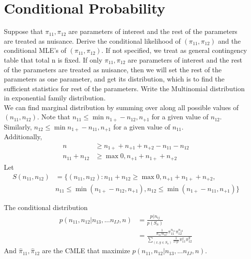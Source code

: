 \section{Conditional Probability}

Suppose that $\pi_{11}, \pi_{12}$ are parameters of interest and the rest of the parameters are treated as nuisance. Derive the conditional likelihood of $(\pi_{11}, \pi_{12})$ and the conditional MLE's of  $(\pi_{11}, \pi_{12})$.
If not specified, we treat as general contingency table that total n is fixed. If only $\pi_{11}, \pi_{12}$ are parameters of interest and the rest of the parameters are treated as nuisance, then we will set the rest of the parameters as one parameter, and get its distribution, which is to find the sufficient statistics for rest of the parameters.
Write the Multinomial distribution in exponential family distribution.\\
We can find marginal distribution by summing over along all possible values of $(n_{11}, n_{12})$. Note that $n_{11} \leq \min{n_{1+} - n_{12}, n_{+1}}$ for a given value of $n_{12}$. Similarly, $n_{12} \leq \min{n_{1+}- n_{11}, n_{+1}}$ for a given value of $n_{11}$. \\
Additionally,
\begin{align*}
	n & \geq n_{1+} + n_{+1} + n_{+2} - n_{11} - n_{12} \\
	n_{11} + n_{12} & \geq \max{ 0, n_{+1} + n_{1+} + n_{+2}}
\end{align*}
Let
\begin{align*}
	S(n_{11}, n_{12}) &= \{(n_{11}, n_{12}): n_{11} + n_{12} \geq \max{ 0, n_{+1} + n_{1+} + n_{+2}},\\
	&  n_{11} \leq \min{(n_{1+} - n_{12}, n_{+1})}, n_{12} \leq \min{(n_{1+}- n_{11}, n_{+1})}   \} 
\end{align*}

The conditional distribution
\begin{align*}
	p(n_{11}, n_{12}|n_{13}, ...n_{IJ}, n) &= \frac{p(n_{ij}}{p(S_n)}\\
	&= \frac{\frac{1}{n_{11}! n_{12}! } \pi_{11}^{n_{11}} \pi_{12}^{n_{12}}}{\sum_{(x, y \in S_n)} \frac{1}{x! y!} \pi_{11}^x \pi_{12}^y}
\end{align*}
And $\hat{\pi}_{11}, \hat{\pi}_{12}$ are the CMLE that maximize $p(n_{11}, n_{12}|n_{13}, ...n_{IJ}, n)$.


